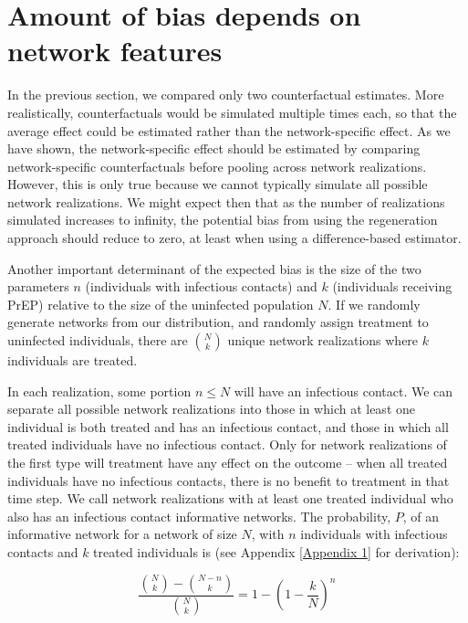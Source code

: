 \documentclass{article}
\theoremstyle{definition}
\begin{document}
\section{Amount of bias depends on network features}
In the previous section, we compared only two counterfactual estimates. More realistically, counterfactuals would be simulated multiple times each, so that the average effect could be estimated rather than the network-specific effect. As we have shown, the network-specific effect should be estimated by comparing network-specific counterfactuals before pooling across network realizations. However, this is only true because we cannot typically simulate all possible network realizations. We might expect then that as the number of realizations simulated increases to infinity, the potential bias from using the regeneration approach should reduce to zero, at least when using a difference-based estimator.

Another important determinant of the expected bias is the size of the two parameters $n$ (individuals with infectious contacts) and $k$ (individuals receiving PrEP) relative to the size of the uninfected population $N$. If we randomly generate networks from our distribution, and randomly assign treatment to uninfected individuals, there are $\binom{N}{k}$ unique network realizations where $k$ individuals are treated. 

In each realization, some portion $n \le N$ will have an infectious contact. We can separate all possible network realizations into those in which at least one individual is both treated and has an infectious contact, and those in which all treated individuals have no infectious contact. Only for network realizations of the first type will treatment have any effect on the outcome -- when all treated individuals have no infectious contacts, there is no benefit to treatment in that time step. We call network realizations with at least one treated individual who also has an infectious contact informative networks. The probability, $P$, of an informative network for a network of size $N$, with $n$ individuals with infectious contacts and $k$ treated individuals is (see Appendix \ref{Appendix 1} for derivation):

\begin{equation}\label{eq:17}
    \frac{{\binom{N}{k}}-{\binom{N-n}{k}}}{{\binom{N}{k}}}=1-\left(1-\frac{k}{N}\right)^{n}
\end{equation}
\end{document}
